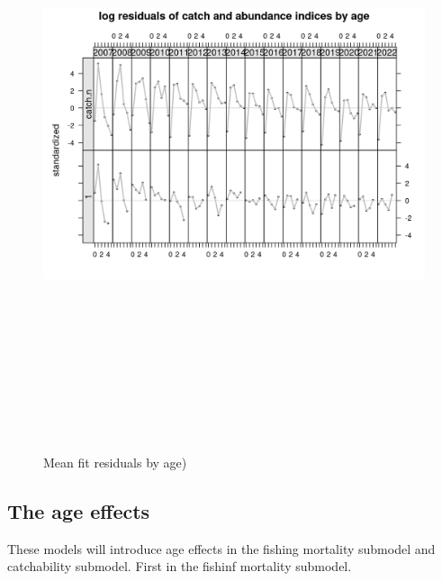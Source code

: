 \documentclass[
]{book}
\begin{document}
\begin{figure}
\includegraphics[width=25cm,height=18cm,angle=90]{_bookdown_files/_main_files/figure-html/meanresbyage-1} \caption{Mean fit residuals by age)}\label{fig:meanresbyage}
\end{figure}

\hypertarget{the-age-effects}{%
\subsection{The age effects}\label{the-age-effects}}

These models will introduce age effects in the fishing mortality submodel and catchability submodel. First in the fishinf mortality submodel.
\end{document}
